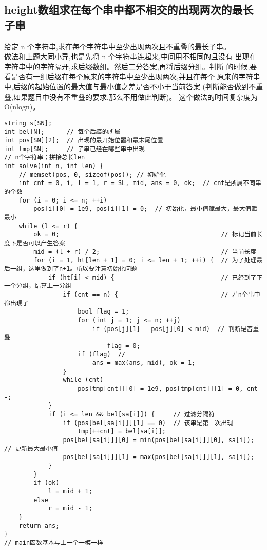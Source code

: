     \subsection{height数组求在每个串中都不相交的出现两次的最长子串}
        给定 n 个字符串,求在每个字符串中至少出现两次且不重叠的最长子串。\\
        做法和上题大同小异,也是先将 n 个字符串连起来,中间用不相同的且没有
        出现在字符串中的字符隔开,求后缀数组。然后二分答案,再将后缀分组。判断
        的时候,要看是否有一组后缀在每个原来的字符串中至少出现两次,并且在每个
        原来的字符串中,后缀的起始位置的最大值与最小值之差是否不小于当前答案
        (判断能否做到不重叠,如果题目中没有不重叠的要求,那么不用做此判断)。
        这个做法的时间复杂度为 O(nlogn)。
\begin{lstlisting}
string s[SN];
int bel[N];      // 每个后缀的所属
int pos[SN][2];  // 出现的最开始位置和最末尾位置
int tmp[SN];     // 子串已经在哪些串中出现
// n个字符串；拼接总长len
int solve(int n, int len) {
    // memset(pos, 0, sizeof(pos)); // 初始化
    int cnt = 0, i, l = 1, r = SL, mid, ans = 0, ok;  // cnt是所属不同串的个数
    for (i = 0; i <= n; ++i)
        pos[i][0] = 1e9, pos[i][1] = 0;  // 初始化，最小值赋最大，最大值赋最小
    while (l <= r) {
        ok = 0;                                            // 标记当前长度下是否可以产生答案
        mid = (l + r) / 2;                                 // 当前长度
        for (i = 1, ht[len + 1] = 0; i <= len + 1; ++i) {  // 为了处理最后一组，这里做到了n+1。所以要注意初始化问题
            if (ht[i] < mid) {                             // 已经到了下一个分组，结算上一分组
                if (cnt == n) {                            // 若n个串中都出现了
                    bool flag = 1;
                    for (int j = 1; j <= n; ++j)
                        if (pos[j][1] - pos[j][0] < mid)  // 判断是否重叠
                            flag = 0;
                    if (flag)  //
                        ans = max(ans, mid), ok = 1;
                }
                while (cnt)
                    pos[tmp[cnt]][0] = 1e9, pos[tmp[cnt]][1] = 0, cnt--;
            }
            if (i <= len && bel[sa[i]]) {     // 过滤分隔符
                if (pos[bel[sa[i]]][1] == 0)  // 该串是第一次出现
                    tmp[++cnt] = bel[sa[i]];
                pos[bel[sa[i]]][0] = min(pos[bel[sa[i]]][0], sa[i]);  // 更新最大最小值
                pos[bel[sa[i]]][1] = max(pos[bel[sa[i]]][1], sa[i]);
            }
        }
        if (ok)
            l = mid + 1;
        else
            r = mid - 1;
    }
    return ans;
}
// main函数基本与上一个一模一样
\end{lstlisting}